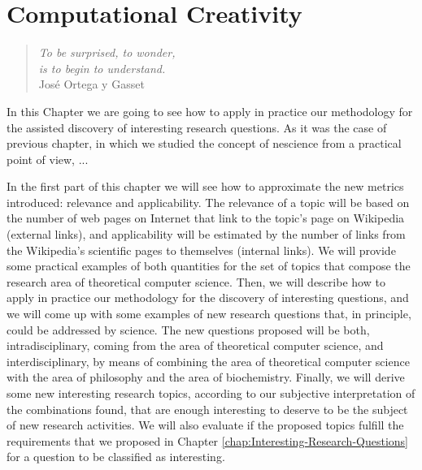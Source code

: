 %
%


\chapter{Computational Creativity}
\label{chap:computational-creativity}

\begin{quote}
\begin{flushright}
\emph{To be surprised, to wonder, \\
is to begin to understand.}\\
José Ortega y Gasset \\
\end{flushright}
\end{quote}
\bigskip

In this Chapter we are going to see how to apply in practice our methodology for the assisted discovery of interesting research questions. As it was the case of previous chapter, in which we studied the concept of nescience from a practical point of view, ...

In the first part of this chapter we will see how to approximate the new metrics introduced: relevance and applicability. The relevance of a topic will be based on the number of web pages on Internet that link to the topic's page on Wikipedia (external links), and applicability will be estimated by the number of links from the Wikipedia's scientific pages to themselves (internal links). We will provide some practical examples of both quantities for the set of topics that compose the research area of theoretical computer science. Then, we will describe how to apply in practice our methodology for the discovery of interesting questions, and we will come up with some examples of new research questions that, in principle, could be addressed by science. The new questions proposed will be both, intradisciplinary, coming from the area of theoretical computer science, and interdisciplinary, by means of combining the area of theoretical computer science with the area of philosophy and the area of biochemistry. Finally, we will derive some new interesting research topics, according to our subjective interpretation of the combinations found, that are enough interesting to deserve to be the subject of new research activities. We will also evaluate if the proposed topics fulfill the requirements that we proposed in Chapter \ref{chap:Interesting-Research-Questions} for a question to be classified as interesting.

